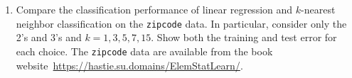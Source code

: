 \documentclass[]{book}
\theoremstyle{definition}
\newtheorem*{soln}{Solution}
\newcommand{\XX}{\mathbf{X}} \newcommand{\YY}{\mathbf{Y}}
\DeclareMathOperator*{\Bias}{Bias} \DeclareMathOperator*{\tr}{trace}
\begin{document}
\begin{enumerate}
\begin{soln}
{\begin{enumerate}
				      \item We have that
				            \begin{equation}
					            \begin{split}
						            E_{\YY/\XX}[(f(x_0)-\hat f(x_0))^2]
						            &= E_{\YY/\XX}[f^2(x_0)-2f(x_0)\hat f(x_0)+\hat f^2(x_0)] \\
						            &= \Var\nolimits_{\YY/\XX}(f(x_0)) + \Var\nolimits_{\YY/\XX}(\hat f(x_0)) +
						            E_{\YY/\XX}[(f(x_0)-\hat f(x_0))]^2 \\
						            &= \Var\nolimits_{\YY/\XX}(f(x_0)) + \Var\nolimits_{\YY/\XX}(\hat f(x_0)) +
						            \Bias\nolimits_{\YY/\XX}[\hat f(x_0)]^2 \\
						            &= \Var\nolimits_{\YY/\XX}(\hat f(x_0)) +
						            \Bias\nolimits_{\YY/\XX}[\hat f(x_0)]^2
					            \end{split}
				            \end{equation}
				            since $f(x_0)$ does not have any randomness.
				      \item Similarly,
				            \begin{equation}
					            \begin{split}
						            E_{\YY,\XX}[(f(x_0)-\hat f(x_0))^2]
						            &= \Var\nolimits_{\YY,\XX}(\hat f(x_0)) +
						            \Bias\nolimits_{\YY,\XX}[\hat f(x_0)]^2.
					            \end{split}
				            \end{equation}
				      \item We have that
				            \[\Var\nolimits_{\YY,\XX}(\hat f(x_0)) = E_{\XX\sim
					            h}[\Var\nolimits_{\YY,\XX}(\hat f(x_0))]\]
				            \[\Bias\nolimits_{\YY,\XX}(\hat f(x_0)) = E_{\XX\sim
					            h}[\Bias\nolimits_{\YY,\XX}(\hat f(x_0))]\]
			      \end{enumerate}}
	      \end{soln}

	      \item\label{ex:2.8} Compare the classification performance of linear
	      regression and $k$-nearest neighbor classification on the
	      \texttt{zipcode} data. In particular, consider only the 2's and 3's
	      and $k=1,3,5,7,15$. Show both the training and test error for each
	      choice. The \texttt{zipcode} data are available from the book
	      website~\url{https://hastie.su.domains/ElemStatLearn/}.


\end{enumerate}
\end{document}
